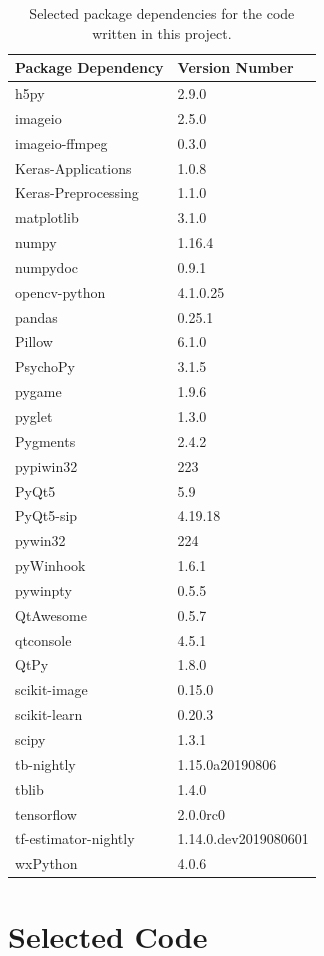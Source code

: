 \documentclass[a4paper,11pt,openany]{book}
\begin{document}
\begin{appendices}
\linespread{1.1}
\thispagestyle{empty}
\begin{table}[htbp]
\caption[Selected package dependencies for the project.]{\label{tab:org951ca31}
Selected package dependencies for the code written in this project.}
\centering
\small
\begin{tabu}{Xl}
\textbf{Package Dependency} & \textbf{Version Number}\\
\hline
h5py & 2.9.0\\
imageio & 2.5.0\\
imageio-ffmpeg & 0.3.0\\
Keras-Applications & 1.0.8\\
Keras-Preprocessing & 1.1.0\\
matplotlib & 3.1.0\\
numpy & 1.16.4\\
numpydoc & 0.9.1\\
opencv-python & 4.1.0.25\\
pandas & 0.25.1\\
Pillow & 6.1.0\\
PsychoPy & 3.1.5\\
pygame & 1.9.6\\
pyglet & 1.3.0\\
Pygments & 2.4.2\\
pypiwin32 & 223\\
PyQt5 & 5.9\\
PyQt5-sip & 4.19.18\\
pywin32 & 224\\
pyWinhook & 1.6.1\\
pywinpty & 0.5.5\\
QtAwesome & 0.5.7\\
qtconsole & 4.5.1\\
QtPy & 1.8.0\\
scikit-image & 0.15.0\\
scikit-learn & 0.20.3\\
scipy & 1.3.1\\
tb-nightly & 1.15.0a20190806\\
tblib & 1.4.0\\
tensorflow & 2.0.0rc0\\
tf-estimator-nightly & 1.14.0.dev2019080601\\
wxPython & 4.0.6\\
\end{tabu}
\end{table}

\chapter{Selected Code}
\label{sec:orgc03a85c}
\label{orgd21b09b}


\end{appendices}
\end{document}
